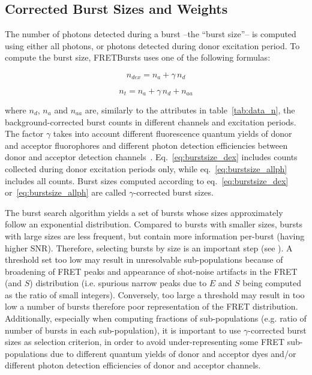 \documentclass[10pt,letterpaper]{article}
\begin{document}
\subsection*{Corrected Burst Sizes and Weights}
\label{sec:burstsizeweights}

The number of photons detected during a burst --the ``burst size''--
is computed using either all photons, or photons detected
during donor excitation period. To compute the burst size, FRETBursts uses
one of the following formulas:

\begin{equation}
\label{eq:burstsize_dex}
n_{dex} = n_a + \gamma\,n_d
\end{equation}

\begin{equation}
\label{eq:burstsize_allph}
n_t = n_a + \gamma\,n_d + n_{aa}
\end{equation}

\noindent where $n_d$, $n_a$ and $n_{aa}$ are, similarly to the attributes
in table~\ref{tab:data_n}, the background-corrected
burst counts in different channels and excitation periods.
The factor $\gamma$ takes into account
different fluorescence quantum yields of donor and acceptor fluorophores and different
photon detection efficiencies between donor and acceptor detection
channels~\cite{Deniz_1999,Lee_2005}.
Eq.~\ref{eq:burstsize_dex} includes counts collected during donor excitation periods only,
while eq.~\ref{eq:burstsize_allph} includes all counts.
Burst sizes computed according to eq.~\ref{eq:burstsize_dex}
or~\ref{eq:burstsize_allph} are called $\gamma$-corrected burst sizes.

The burst search algorithm yields a set of bursts whose sizes
approximately follow an exponential distribution.
Compared to bursts with smaller sizes, bursts with large sizes are less frequent, 
but contain more information per-burst (having higher SNR).
Therefore, selecting bursts by size is an important step (see ).
A threshold set too low may result in unresolvable sub-populations
because of broadening of FRET peaks and appearance of shot-noise artifacts
in the FRET (and $S$) distribution (i.e. spurious narrow peaks due to $E$ and $S$ being
computed as the ratio of small integers).
Conversely, too large a threshold may result in too low a number of bursts
therefore poor representation of the FRET distribution.
Additionally, especially when computing fractions of sub-populations
(e.g. ratio of number of bursts in each sub-population),
it is important to use $\gamma$-corrected burst sizes as selection criterion,
in order to avoid under-representing some FRET sub-populations
due to different quantum yields of donor and acceptor dyes and/or
different photon detection efficiencies of donor and acceptor channels.
\end{document}
